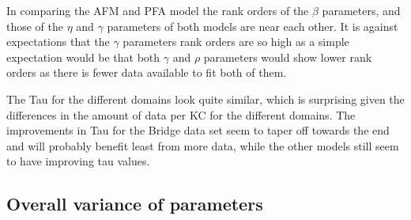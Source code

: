 \documentclass{scrartcl}
\begin{document}
In comparing the AFM and PFA model the rank orders of the $\beta$ parameters, and those of the $\eta$ and $\gamma$ parameters of both models are near each other. It is against expectations that the $\gamma$ parameters rank orders are so high as a simple expectation would be that both $\gamma$ and $\rho$ parameters would show lower rank orders as there is fewer data available to fit both of them.
 
The Tau for the different domains look quite similar, which is surprising given the differences in the amount of data per KC for the different domains. The improvements in Tau for the Bridge data set seem to taper off towards the end and will probably benefit least from more data, while the other models still seem to have improving tau values. 
\subsection{Overall variance of parameters}
\end{document}
